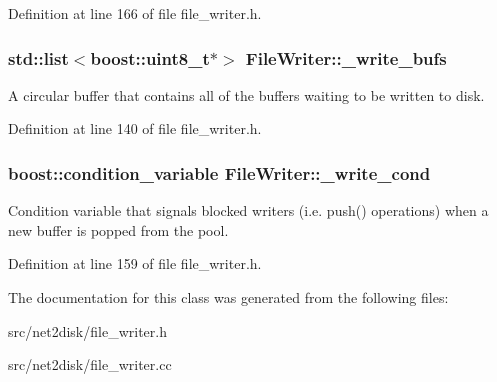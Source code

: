 Definition at line 166 of file file\_\-writer.h.

\hypertarget{class_file_writer_aca52ee3a5dcc8649a1aa702ba6de6af6}{
\subsubsection[{\_\-write\_\-bufs}]{\setlength{\rightskip}{0pt plus 5cm}std::list$<$boost::uint8\_\-t$\ast$$>$ {\bf FileWriter::\_\-write\_\-bufs}}}
\label{class_file_writer_aca52ee3a5dcc8649a1aa702ba6de6af6}
A circular buffer that contains all of the buffers waiting to be written to disk. 

Definition at line 140 of file file\_\-writer.h.

\hypertarget{class_file_writer_af0d0e6ad7c4b2f7ce920540728fbcb20}{
\subsubsection[{\_\-write\_\-cond}]{\setlength{\rightskip}{0pt plus 5cm}boost::condition\_\-variable {\bf FileWriter::\_\-write\_\-cond}}}
\label{class_file_writer_af0d0e6ad7c4b2f7ce920540728fbcb20}
Condition variable that signals blocked writers (i.e. push() operations) when a new buffer is popped from the pool. 

Definition at line 159 of file file\_\-writer.h.



The documentation for this class was generated from the following files:\begin{DoxyCompactItemize}
\item 
src/net2disk/file\_\-writer.h\item 
src/net2disk/file\_\-writer.cc\end{DoxyCompactItemize}

